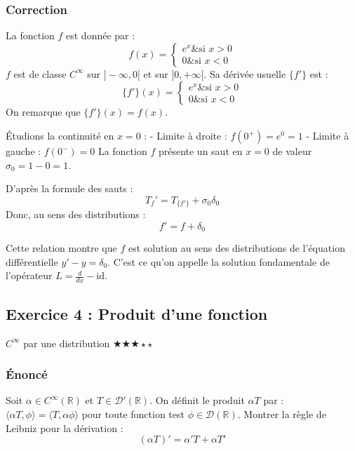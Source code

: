 \documentclass[11pt,a4paper]{article}
\begin{document}
\subsubsection*{Correction}
La fonction $f$ est donnée par :
$$
f(x) = \begin{cases}
e^x \& \text{si } x > 0 \\
0 \& \text{si } x < 0
\end{cases}
$$
$f$ est de classe $C^\infty$ sur $]-\infty, 0[$ et sur $]0, +\infty[$.
Sa dérivée usuelle $\{f'\}$ est :
$$
\{f'\}(x) = \begin{cases}
e^x \& \text{si } x > 0 \\
0 \& \text{si } x < 0
\end{cases}
$$
On remarque que $\{f'\}(x) = f(x)$.

Étudions la continuité en $x = 0$ :
- Limite à droite : $f(0^+) = e^0 = 1$
- Limite à gauche : $f(0^-) = 0$
La fonction $f$ présente un saut en $x=0$ de valeur $\sigma_0 = 1 - 0 = 1$.

D'après la formule des sauts :
$$ T_f' = T_{\{f'\}} + \sigma_0 \delta_0 $$
Donc, au sens des distributions :
$$ f' = f + \delta_0 $$

Cette relation montre que $f$ est solution au sens des distributions de l'équation différentielle $y' - y = \delta_0$. C'est ce qu'on appelle la solution fondamentale de l'opérateur $L = \frac{d}{dx} - \text{id}$.


\subsection*{Exercice 4 : Produit d'une fonction}$C^\infty$ par une distribution  \quad $\bigstar\bigstar\bigstar\star\star$


\subsubsection*{Énoncé}
Soit $\alpha \in C^\infty(\mathbb{R})$ et $T \in \mathcal{D}'(\mathbb{R})$.
On définit le produit $\alpha T$ par : $\langle \alpha T, \phi \rangle = \langle T, \alpha \phi \rangle$ pour toute fonction test $\phi \in \mathcal{D}(\mathbb{R})$.
Montrer la règle de Leibniz pour la dérivation :
$$ (\alpha T)' = \alpha' T + \alpha T' $$
\end{document}
